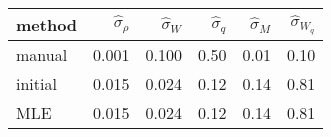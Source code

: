 
\begin{tabular}{lrrrrr}
\toprule
method & $\hat\sigma_{ \rho }$ & $\hat\sigma_{ W }$ & $\hat\sigma_{ q }$ & $\hat\sigma_{ M }$ & $\hat\sigma_{ W_q }$\\
\midrule
manual & 0.001 & 0.100 & 0.50 & 0.01 & 0.10\\
initial & 0.015 & 0.024 & 0.12 & 0.14 & 0.81\\
MLE & 0.015 & 0.024 & 0.12 & 0.14 & 0.81\\
\bottomrule
\end{tabular}